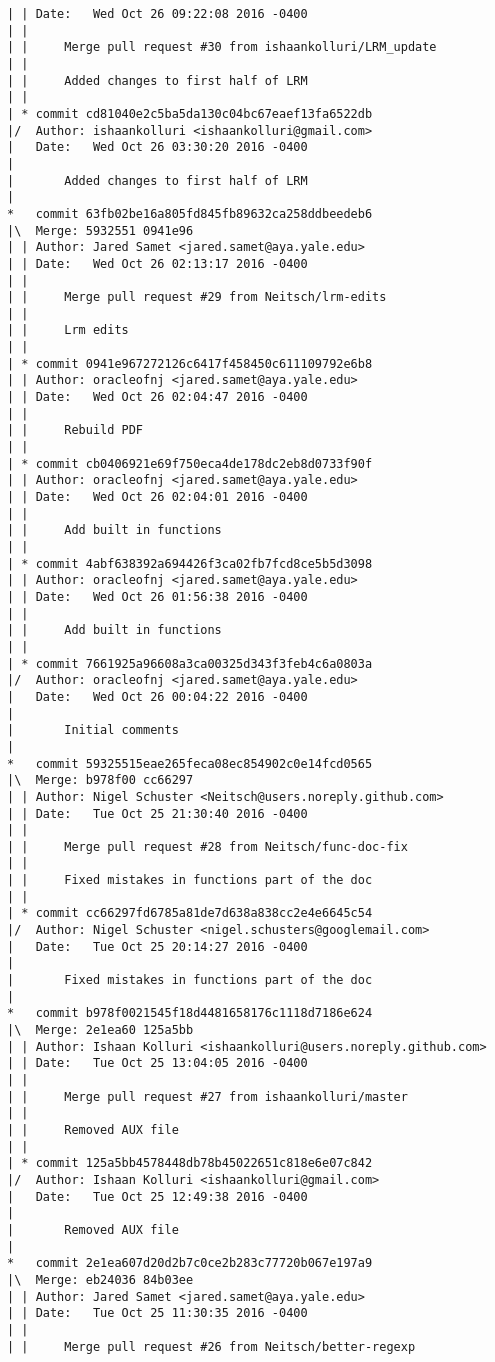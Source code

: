 \begin{lstlisting}
| | Date:   Wed Oct 26 09:22:08 2016 -0400
| | 
| |     Merge pull request #30 from ishaankolluri/LRM_update
| |     
| |     Added changes to first half of LRM
| |   
| * commit cd81040e2c5ba5da130c04bc67eaef13fa6522db
|/  Author: ishaankolluri <ishaankolluri@gmail.com>
|   Date:   Wed Oct 26 03:30:20 2016 -0400
|   
|       Added changes to first half of LRM
|    
*   commit 63fb02be16a805fd845fb89632ca258ddbeedeb6
|\  Merge: 5932551 0941e96
| | Author: Jared Samet <jared.samet@aya.yale.edu>
| | Date:   Wed Oct 26 02:13:17 2016 -0400
| | 
| |     Merge pull request #29 from Neitsch/lrm-edits
| |     
| |     Lrm edits
| |   
| * commit 0941e967272126c6417f458450c611109792e6b8
| | Author: oracleofnj <jared.samet@aya.yale.edu>
| | Date:   Wed Oct 26 02:04:47 2016 -0400
| | 
| |     Rebuild PDF
| |   
| * commit cb0406921e69f750eca4de178dc2eb8d0733f90f
| | Author: oracleofnj <jared.samet@aya.yale.edu>
| | Date:   Wed Oct 26 02:04:01 2016 -0400
| | 
| |     Add built in functions
| |   
| * commit 4abf638392a694426f3ca02fb7fcd8ce5b5d3098
| | Author: oracleofnj <jared.samet@aya.yale.edu>
| | Date:   Wed Oct 26 01:56:38 2016 -0400
| | 
| |     Add built in functions
| |   
| * commit 7661925a96608a3ca00325d343f3feb4c6a0803a
|/  Author: oracleofnj <jared.samet@aya.yale.edu>
|   Date:   Wed Oct 26 00:04:22 2016 -0400
|   
|       Initial comments
|    
*   commit 59325515eae265feca08ec854902c0e14fcd0565
|\  Merge: b978f00 cc66297
| | Author: Nigel Schuster <Neitsch@users.noreply.github.com>
| | Date:   Tue Oct 25 21:30:40 2016 -0400
| | 
| |     Merge pull request #28 from Neitsch/func-doc-fix
| |     
| |     Fixed mistakes in functions part of the doc
| |   
| * commit cc66297fd6785a81de7d638a838cc2e4e6645c54
|/  Author: Nigel Schuster <nigel.schusters@googlemail.com>
|   Date:   Tue Oct 25 20:14:27 2016 -0400
|   
|       Fixed mistakes in functions part of the doc
|    
*   commit b978f0021545f18d4481658176c1118d7186e624
|\  Merge: 2e1ea60 125a5bb
| | Author: Ishaan Kolluri <ishaankolluri@users.noreply.github.com>
| | Date:   Tue Oct 25 13:04:05 2016 -0400
| | 
| |     Merge pull request #27 from ishaankolluri/master
| |     
| |     Removed AUX file
| |   
| * commit 125a5bb4578448db78b45022651c818e6e07c842
|/  Author: Ishaan Kolluri <ishaankolluri@gmail.com>
|   Date:   Tue Oct 25 12:49:38 2016 -0400
|   
|       Removed AUX file
|    
*   commit 2e1ea607d20d2b7c0ce2b283c77720b067e197a9
|\  Merge: eb24036 84b03ee
| | Author: Jared Samet <jared.samet@aya.yale.edu>
| | Date:   Tue Oct 25 11:30:35 2016 -0400
| | 
| |     Merge pull request #26 from Neitsch/better-regexp

\end{lstlisting}
